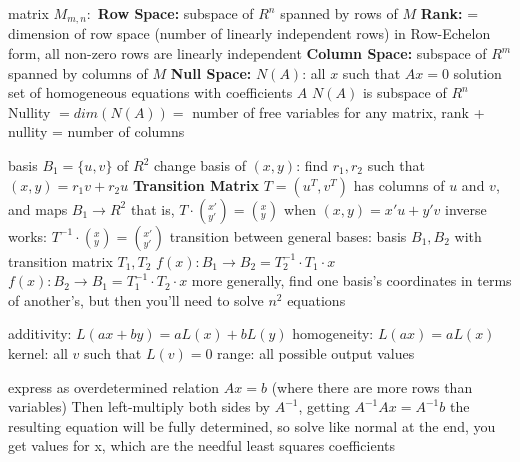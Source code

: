 \documentclass[12pt]{article}
\begin{document}
\begin{multicols*}{2}
\begin{flushleft}
\begin{outline}[longenum]
  \1 matrix $M_{m,n}:$
  \1 \textbf{Row Space:} subspace of $R^n$ spanned by rows of $M$
    \2 \textbf{Rank:} = dimension of row space (number of linearly independent rows)
    \2 in Row-Echelon form, all non-zero rows are linearly independent
  \1 \textbf{Column Space:} subspace of $R^m$ spanned by columns of $M$
  \1 \textbf{Null Space:} $N(A)$: all $x$ such that $Ax=0$
    \2 solution set of homogeneous equations with coefficients $A$
    \2 $N(A)$ is subspace of $R^n$
    \2 Nullity $=dim(N(A))=$ number of free variables
  \1 for any matrix, rank + nullity = number of columns

  \1 basis $B_1=\{u,v\}$ of $R^2$
  \1 change basis of $(x,y)$: find $r_1,r_2$ such that $(x,y) = r_1v + r_2u$
  \1 \textbf{Transition Matrix} $T=(u^T,v^T)$ has columns of $u$ and $v$, and maps $B_1\rightarrow R^2$
    \2 that is, $T\cdot(^{x'}_{y'}) = (^x_y)$ when $(x,y)=x'u+y'v$
    \2 inverse works: $T^{-1}\cdot(^x_y) = (^{x'}_{y'})$
  \1 transition between general bases:
    \2 basis $B_1,B_2$ with transition matrix $T_1,T_2$
    \2 $f(x): B_1 \rightarrow B_2 = T_2^{-1}\cdot T_1 \cdot x $
    \2 $f(x): B_2 \rightarrow B_1 = T_1^{-1}\cdot T_2 \cdot x $
    \2 more generally, find one basis's coordinates in terms of another's, but then you'll need to solve $n^2$ equations

  \1 additivity:  $L(ax+by) = aL(x)+bL(y)$
  \1 homogeneity: $L(ax) = aL(x)$
  \1 kernel: all $v$ such that $L(v)=0$
  \1 range: all possible output values

  \1 express as overdetermined relation $Ax = b$ (where there are more rows than variables)
  \1 Then left-multiply both sides by $A^{-1}$, getting $A^{-1}Ax=A^{-1}b$
  \1 the resulting equation will be fully determined, so solve like normal
  \1 at the end, you get values for x, which are the needful least squares coefficients



\end{outline}
\end{flushleft}
\end{multicols*}
\end{document}
